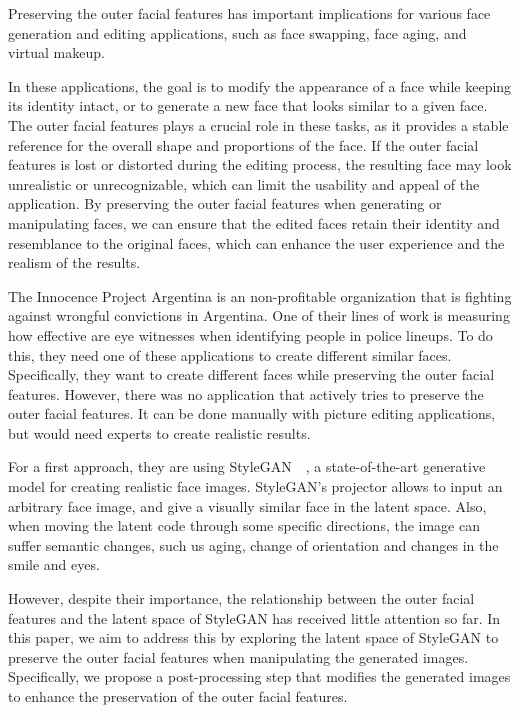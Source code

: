 \documentclass[review]{elsarticle}
\begin{document}
Preserving the outer facial features has important implications for various face generation and editing applications, such as face swapping, face aging, and virtual makeup. 

In these applications, the goal is to modify the appearance of a face while keeping its identity intact, or to generate a new face that looks similar to a given face. The outer facial features plays a crucial role in these tasks, as it provides a stable reference for the overall shape and proportions of the face. If the outer facial features is lost or distorted during the editing process, the resulting face may look unrealistic or unrecognizable, which can limit the usability and appeal of the application. By preserving the outer facial features when generating or manipulating faces, we can ensure that the edited faces retain their identity and resemblance to the original faces, which can enhance the user experience and the realism of the results.

The Innocence Project Argentina is an non-profitable organization that is fighting against wrongful convictions in Argentina. One of their lines of work is measuring how effective are eye witnesses when identifying people in police lineups. To do this, they need one of these applications to create different similar faces. Specifically, they want to create different faces while preserving the outer facial features. However, there was no application that actively tries to preserve the outer facial features. It can be done manually with picture editing applications, but would need experts to create realistic results.

For a first approach, they are using StyleGAN~\cite{Karras_2018}~\cite{Karras_2019}, a state-of-the-art generative model for creating realistic face images. StyleGAN's projector allows to input an arbitrary face image, and give a visually similar face in the latent space. Also, when moving the latent code through some specific directions, the image can suffer semantic changes, such us aging, change of orientation and changes in the smile and eyes.

However, despite their importance, the relationship between the outer facial features and the latent space of StyleGAN has received little attention so far. In this paper, we aim to address this by exploring the latent space of StyleGAN to preserve the outer facial features when manipulating the generated images. Specifically, we propose a post-processing step that modifies the generated images to enhance the preservation of the outer facial features.
\end{document}
